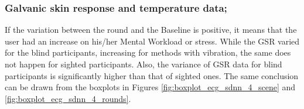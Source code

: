 \subsubsection{Galvanic skin response and temperature data;}
\label{subsubsec:results_gsr_temp_2}


%
%
%
%
If the variation between the round and the Baseline is positive, it means that the user had an increase on his/her Mental Workload or stress. While the GSR varied for the blind participants, increasing for methods with vibration, the same does not happen for sighted participants. Also, the variance of GSR data for blind participants is significantly higher than that of sighted ones. The same conclusion can be drawn from the boxplots in Figures \ref{fig:boxplot_ecg_sdnn_4_scene} and \ref{fig:boxplot_ecg_sdnn_4_rounds}. 


